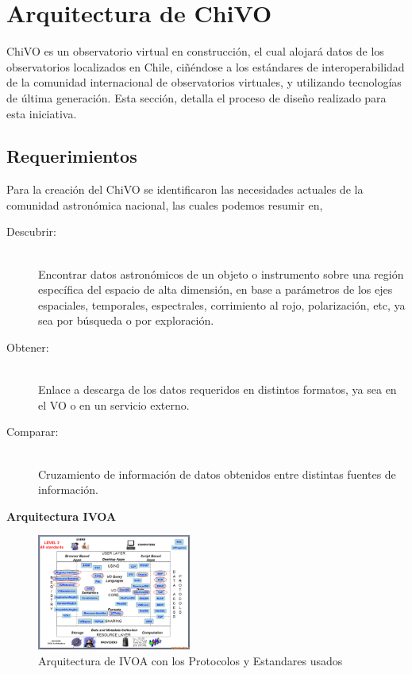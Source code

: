 \section{Arquitectura de ChiVO}

ChiVO es un observatorio virtual en construcción, el cual alojará datos de los
observatorios localizados en Chile, ciñéndose a los estándares de
interoperabilidad de la comunidad internacional de observatorios virtuales,
y utilizando tecnologías de última generación. Esta sección, detalla el
proceso de diseño realizado para esta iniciativa.

\subsection{Requerimientos}

Para la creación del ChiVO se identificaron las necesidades actuales de la comunidad
astronómica nacional, las cuales podemos resumir en,

\begin{description}
    \item[Descubrir:] \hfill \\
        Encontrar datos astronómicos de un objeto o instrumento sobre una región
        específica del espacio de alta dimensión, en base a parámetros de los ejes
        espaciales, temporales, espectrales, corrimiento al rojo, polarización, etc,
        ya sea por búsqueda o por exploración.
    \item[Obtener:] \hfill \\
        Enlace a descarga de los datos requeridos en distintos formatos, ya sea en
        el VO o en un servicio externo.
    \item[Comparar:] \hfill \\
        Cruzamiento de información de datos obtenidos entre distintas fuentes de
        información.
\end{description}

\textbf{Arquitectura IVOA}


\begin{figure}[ht]
    \centering
    \includegraphics[width=0.45\textwidth]{images/arquitectura_2.png}
    \caption{Arquitectura de IVOA con los Protocolos y Estandares usados}
    \label{fig:ivoarch}
\end{figure}



